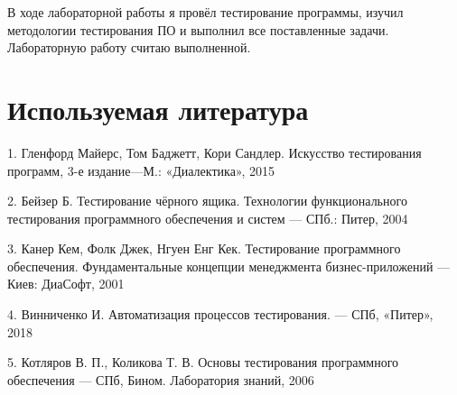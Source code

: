 \documentclass[12pt]{article}
\begin{document}
    В ходе лабораторной работы я провёл тестирование программы, изучил методологии тестирования ПО и выполнил все поставленные задачи. Лабораторную работу считаю выполненной.

    \section*{Используемая литература}

    1. Гленфорд Майерс, Том Баджетт, Кори Сандлер. Искусство тестирования программ, 3-е издание—М.: «Диалектика», 2015

    2. Бейзер Б. Тестирование чёрного ящика. Технологии функционального тестирования программного обеспечения и систем --- СПб.: Питер, 2004

    3. Канер Кем, Фолк Джек, Нгуен Енг Кек. Тестирование программного обеспечения. Фундаментальные концепции менеджмента бизнес-приложений --- Киев: ДиаСофт, 2001

    4. Винниченко И. Автоматизация процессов тестирования. --- СПб, «Питер», 2018

    5. Котляров В. П., Коликова Т. В. Основы тестирования программного обеспечения --- СПб, Бином. Лаборатория знаний, 2006
\end{document}
